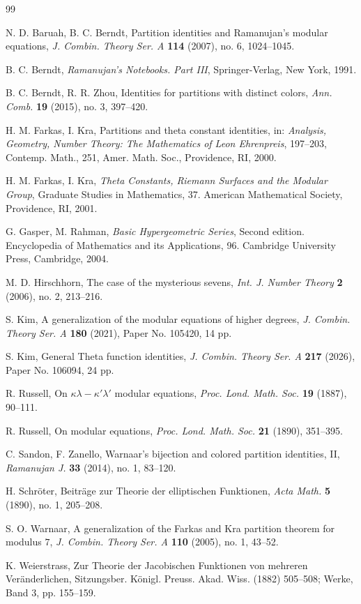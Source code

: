 \documentclass[12pt,reqno]{amsart}
\numberwithin{equation}{section}
\theoremstyle{plain}
\theoremstyle{definition}
\begin{document}

\begin{thebibliography}{99}



N. D. Baruah, B. C. Berndt,
Partition identities and Ramanujan's modular equations,
\textit{J. Combin. Theory Ser. A} \textbf{114} (2007), no. 6, 1024--1045.


B. C. Berndt,
\textit{Ramanujan's Notebooks. Part III},
Springer-Verlag, New York, 1991.


B. C. Berndt, R. R. Zhou,
Identities for partitions with distinct colors,
\textit{Ann. Comb.} \textbf{19} (2015), no. 3, 397--420.


H. M. Farkas, I. Kra,
Partitions and theta constant identities, in: \textit{Analysis, Geometry, Number
Theory: The Mathematics of Leon Ehrenpreis}, 197--203, Contemp. Math., 251,
Amer. Math. Soc., Providence, RI, 2000.


H. M. Farkas, I. Kra,
\textit{Theta Constants, Riemann Surfaces and the Modular Group},
Graduate Studies in Mathematics, 37.
American Mathematical Society, Providence, RI, 2001.


G. Gasper, M. Rahman,
\textit{Basic Hypergeometric Series},
Second edition. Encyclopedia of Mathematics and its Applications, 96.
Cambridge University Press, Cambridge, 2004.


M. D. Hirschhorn,
The case of the mysterious sevens,
\textit{Int. J. Number Theory} \textbf{2} (2006), no. 2, 213--216.


S. Kim,
A generalization of the modular equations of higher degrees,
\textit{J. Combin. Theory Ser. A} \textbf{180} (2021), Paper No. 105420, 14 pp.


S. Kim,
General Theta function identities,
\textit{J. Combin. Theory Ser. A} \textbf{217} (2026), Paper No. 106094, 24 pp.


R. Russell,
On $\kappa\lambda-\kappa'\lambda'$ modular equations,
\textit{Proc. Lond. Math. Soc.} \textbf{19} (1887), 90--111.


R. Russell,
On modular equations,
\textit{Proc. Lond. Math. Soc.} \textbf{21} (1890), 351--395.


C. Sandon, F. Zanello,
Warnaar's bijection and colored partition identities, II,
\textit{Ramanujan J.} \textbf{33} (2014), no. 1, 83--120.


H. Schr\"{o}ter,
Beitr\"{a}ge zur Theorie der elliptischen Funktionen,
\textit{Acta Math.} \textbf{5} (1890), no. 1, 205--208.


S. O. Warnaar,
A generalization of the Farkas and Kra partition theorem for modulus $7$,
\textit{J. Combin. Theory Ser. A} \textbf{110} (2005), no. 1, 43--52.


K. Weierstrass,
Zur Theorie der Jacobischen Funktionen von mehreren
Ver\"{a}nderlichen, Sitzungsber. K\"{o}nigl. Preuss. Akad. Wiss. (1882) 505--508;
Werke, Band 3, pp. 155--159.


\end{thebibliography}
\end{document}
